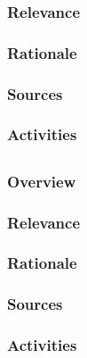 \documentclass[12pt]{amsart}
\begin{document}
\subsubsection{Relevance}
\subsubsection{Rationale}
\subsubsection{Sources}
\subsubsection{Activities}



\subsection{}
\subsubsection{Overview}
\subsubsection{Relevance}
\subsubsection{Rationale}
\subsubsection{Sources}
\subsubsection{Activities}
\end{document}

